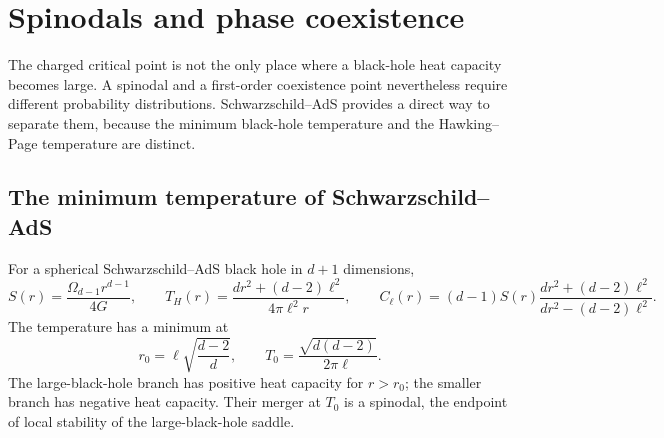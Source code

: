 \documentclass[11pt,letterpaper]{article}
\theoremstyle{plain}
\theoremstyle{definition}
\theoremstyle{remark}
\begin{document}
\section{Spinodals and phase coexistence}
\label{sec05:phases}

The charged critical point is not the only place where a black-hole heat capacity becomes large. A spinodal and a first-order coexistence point nevertheless require different probability distributions. Schwarzschild--AdS provides a direct way to separate them, because the minimum black-hole temperature and the Hawking--Page temperature are distinct.

\subsection{The minimum temperature of Schwarzschild--AdS}

For a spherical Schwarzschild--AdS black hole in $d+1$ dimensions,
\begin{equation}
 S(r)=\frac{\Omega_{d-1}r^{d-1}}{4G},\qquad
 T_H(r)=\frac{d r^2+(d-2)\ell^2}{4\pi\ell^2r},\qquad
 C_\ell(r)=(d-1)S(r)
 \frac{d r^2+(d-2)\ell^2}{d r^2-(d-2)\ell^2}.
 \label{eq05:schwarzschild_thermodynamics}
\end{equation}
The temperature has a minimum at
\begin{equation}
 r_0=\ell\sqrt{\frac{d-2}{d}},\qquad
 T_0=\frac{\sqrt{d(d-2)}}{2\pi\ell}.
 \label{eq05:minimum_temperature}
\end{equation}
The large-black-hole branch has positive heat capacity for $r>r_0$; the smaller branch has negative heat capacity. Their merger at $T_0$ is a spinodal, the endpoint of local stability of the large-black-hole saddle.
\end{document}
